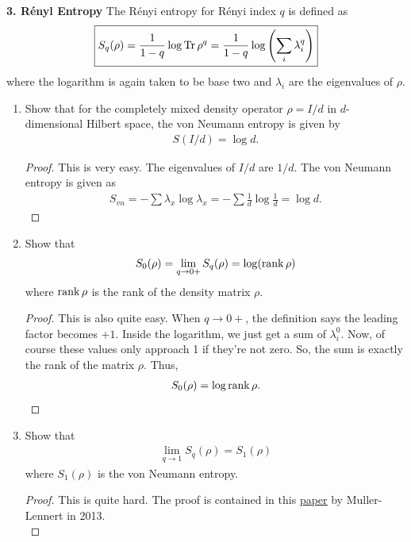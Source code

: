 \documentclass{book}
\theoremstyle{definition}
\newcommand{\f}[2]{\frac{#1}{#2}}
\newcommand{\lp}{\left(}
\newcommand{\rp}{\right)}
\begin{document}
\noindent \textbf{3. R\'enyl Entropy} The R\'enyi entropy for R\'enyi index $q$ is defined as
\begin{align}
\boxed{S_q(\rho) = \f{1}{1-q}\log \Tr \rho^q = \f{1}{1-q} \log \lp \sum_i \lambda_i^q \rp}
\end{align} 
where the logarithm is again taken to be base two and $\lambda_i$ are the eigenvalues of $\rho$.

\begin{enumerate}
	\item Show that for the completely mixed density operator $\rho = I/d$ in $d$-dimensional Hilbert space, the von Neumann entropy is given by
	\begin{align}
	S(I/d) = \log d.
	\end{align}
	
	\begin{proof}
		This is very easy. The eigenvalues of $I/d$ are $1/d$. The von Neumann entropy is given as 
		\begin{align}
		S_{vn} = -\sum \lambda_x \log \lambda_x = -\sum \f{1}{d}\log \f{1}{d} = \log d.
		\end{align}
	\end{proof}
	
	\item Show that 
	\begin{align}
	S_0(\rho) =\lim_{q\to 0+} S_q(\rho) =\log (\rank \rho)
	\end{align}
	where $\rank \rho$ is the rank of the density matrix $\rho$.
	
	\begin{proof}
		This is also quite easy. When $q \to 0+$, the definition says the leading factor becomes $+1$. Inside the logarithm, we just get a sum of $\lambda_i^0$. Now, of course these values only approach 1 if they're not zero. So, the sum is exactly the rank of the matrix $\rho$. Thus, 
		\begin{align}
		S_0(\rho) = \log \rank \rho.
		\end{align} 
	\end{proof}
	
	
	\item Show that 
	\begin{align}
	\lim_{q\to 1} S_q(\rho) = S_1(\rho)
	\end{align}
	where $S_1(\rho)$ is the von Neumann entropy. 
	
	\begin{proof}
		This is quite hard. The proof is contained in this \href{https://arxiv.org/pdf/1306.3142.pdf}{\underline{paper}} by Muller-Lennert in 2013. \\
		

\end{proof}
\end{enumerate}
\end{document}
